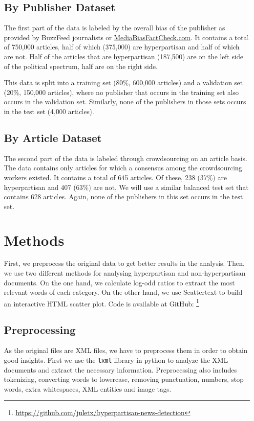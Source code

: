 \documentclass[11pt,a4paper]{article}
\begin{document}
\subsection{By Publisher Dataset}

The first part of the data is labeled by the overall bias of the publisher as provided by BuzzFeed journalists or \href{https://mediabiasfactcheck.com}{MediaBiasFactCheck.com}. It contains a total of 750,000 articles, half of which (375,000) are hyperpartisan and half of which are not. Half of the articles that are hyperpartisan (187,500) are on the left side of the political spectrum, half are on the right side. 

This data is split into a training set (80\%, 600,000 articles) and a validation set (20\%, 150,000 articles), where no publisher that occurs in the training set also occurs in the validation set. Similarly, none of the publishers in those sets occurs in the test set (4,000 articles).

\subsection{By Article Dataset}

The second part of the data is labeled through crowdsourcing on an article basis. The data contains only articles for which a consensus among the crowdsourcing workers existed. It contains a total of 645 articles. Of these, 238 (37\%) are hyperpartisan and 407 (63\%) are not, We will use a similar balanced test set that contains 628 articles. Again, none of the publishers in this set occurs in the test set.

\section{Methods}

First, we preprocess the original data to get better results in the analysis. Then, we use two different methods for analysing hyperpartisan and non-hyperpartisan documents. On the one hand, we calculate log-odd ratios to extract the most relevant words of each category. On the other hand, we use Scattertext \cite{kessler2017scattertext} to build an interactive HTML scatter plot. Code is available at GitHub: \footnote{\url{https://github.com/juletx/hyperpartisan-news-detection}}

\subsection{Preprocessing}
\label{Preprocessing}
As the original files are XML files, we have to preprocess them in order to obtain good insights. First we use the \texttt{lxml} library in python to analyze the XML documents and extract the necessary information. Preprocessing also includes tokenizing, converting words to lowercase, removing punctuation, numbers, stop words, extra whitespaces, XML entities and image tags.
\end{document}
